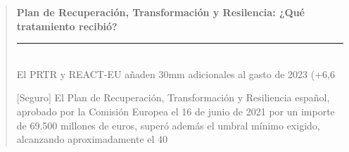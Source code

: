 \documentclass[10pt,a4paper]{article}
\newenvironment{specialblock}[1]{%
      \begin{quote} %
      \small %
      \noindent\textbf{#1}\\[-0.3em] %
      \rule{\linewidth}{0.4pt}\\[0.6em]}{
      \end{quote}}
\begin{document}
\begin{specialblock}{\textbf{Plan de Recuperación, Transformación y Resilencia:} ¿Qué tratamiento recibió?}
    El PRTR y REACT-EU añaden 30mm adicionales al gasto de 2023 (+6,6%
    
    [Seguro] El Plan de Recuperación, Transformación y Resiliencia español, aprobado por la Comisión Europea el 16 de junio de 2021 por un importe de 69.500 millones de euros, superó además el umbral mínimo exigido, alcanzando aproximadamente el 40%
\end{specialblock}
\end{document}
